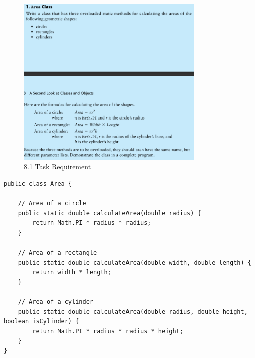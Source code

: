\documentclass{article}
\begin{document}
\begin{figure}[H]
    \centering
    \includegraphics[width=0.8\textwidth]{./Assets/Task requirements/Assignment11/8.1.png}
    \caption{8.1 Task Requirement}
\end{figure}

\begin{lstlisting}[caption=Area.java]
public class Area {

    // Area of a circle
    public static double calculateArea(double radius) {
        return Math.PI * radius * radius;
    }

    // Area of a rectangle
    public static double calculateArea(double width, double length) {
        return width * length;
    }

    // Area of a cylinder
    public static double calculateArea(double radius, double height, boolean isCylinder) {
        return Math.PI * radius * radius * height;
    }
}
\end{lstlisting}
\end{document}

